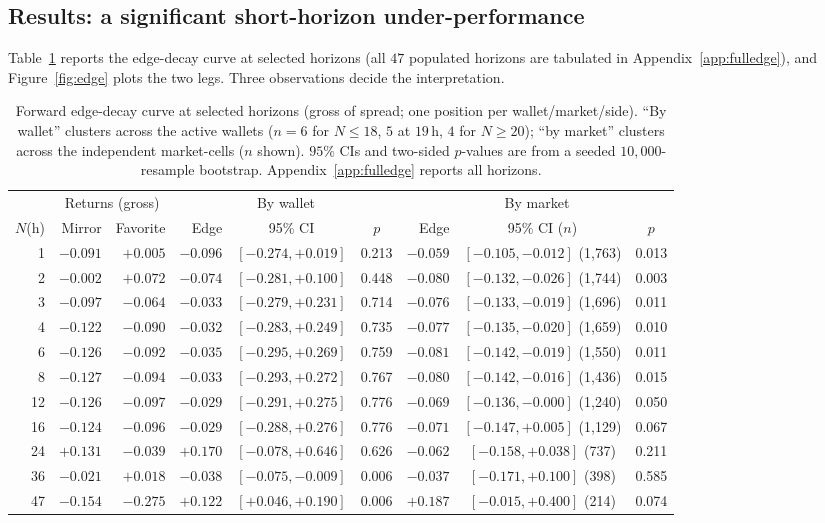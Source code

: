 \documentclass[11pt]{article}
\begin{document}
\subsection{Results: a significant short-horizon under-performance}
Table~\ref{tab:edge} reports the edge-decay curve at selected horizons (all $47$ populated
horizons are tabulated in Appendix~\ref{app:fulledge}), and Figure~\ref{fig:edge} plots the
two legs. Three observations decide the interpretation.

\begin{table}[h]
\centering
\caption{Forward edge-decay curve at selected horizons (gross of spread; one position per
wallet/market/side). ``By wallet'' clusters across the active wallets ($n{=}6$ for $N\le18$,
$5$ at $19$\,h, $4$ for $N\ge20$); ``by market'' clusters across the independent market-cells
($n$ shown). $95\%$ CIs and two-sided $p$-values are from a seeded $10{,}000$-resample
bootstrap. Appendix~\ref{app:fulledge} reports all horizons.}
\label{tab:edge}
\small
\setlength{\tabcolsep}{4pt}
\begin{tabular}{@{}rrr rcc rcc@{}}
\toprule
& \multicolumn{2}{c}{Returns (gross)} & \multicolumn{3}{c}{By wallet} & \multicolumn{3}{c}{By market} \\
\cmidrule(lr){2-3}\cmidrule(lr){4-6}\cmidrule(lr){7-9}
$N$(h) & Mirror & Favorite & Edge & 95\% CI & $p$ & Edge & 95\% CI ($n$) & $p$ \\
\midrule
1 & $-0.091$ & $+0.005$ & $-0.096$ & $[-0.274,+0.019]$ & 0.213 & $-0.059$ & $[-0.105,-0.012]$ (1{,}763) & 0.013 \\
2 & $-0.002$ & $+0.072$ & $-0.074$ & $[-0.281,+0.100]$ & 0.448 & $-0.080$ & $[-0.132,-0.026]$ (1{,}744) & 0.003 \\
3 & $-0.097$ & $-0.064$ & $-0.033$ & $[-0.279,+0.231]$ & 0.714 & $-0.076$ & $[-0.133,-0.019]$ (1{,}696) & 0.011 \\
4 & $-0.122$ & $-0.090$ & $-0.032$ & $[-0.283,+0.249]$ & 0.735 & $-0.077$ & $[-0.135,-0.020]$ (1{,}659) & 0.010 \\
6 & $-0.126$ & $-0.092$ & $-0.035$ & $[-0.295,+0.269]$ & 0.759 & $-0.081$ & $[-0.142,-0.019]$ (1{,}550) & 0.011 \\
8 & $-0.127$ & $-0.094$ & $-0.033$ & $[-0.293,+0.272]$ & 0.767 & $-0.080$ & $[-0.142,-0.016]$ (1{,}436) & 0.015 \\
12 & $-0.126$ & $-0.097$ & $-0.029$ & $[-0.291,+0.275]$ & 0.776 & $-0.069$ & $[-0.136,-0.000]$ (1{,}240) & 0.050 \\
16 & $-0.124$ & $-0.096$ & $-0.029$ & $[-0.288,+0.276]$ & 0.776 & $-0.071$ & $[-0.147,+0.005]$ (1{,}129) & 0.067 \\
24 & $+0.131$ & $-0.039$ & $+0.170$ & $[-0.078,+0.646]$ & 0.626 & $-0.062$ & $[-0.158,+0.038]$ (737) & 0.211 \\
36 & $-0.021$ & $+0.018$ & $-0.038$ & $[-0.075,-0.009]$ & 0.006 & $-0.037$ & $[-0.171,+0.100]$ (398) & 0.585 \\
47 & $-0.154$ & $-0.275$ & $+0.122$ & $[+0.046,+0.190]$ & 0.006 & $+0.187$ & $[-0.015,+0.400]$ (214) & 0.074 \\
\bottomrule
\end{tabular}
\end{table}
\end{document}
